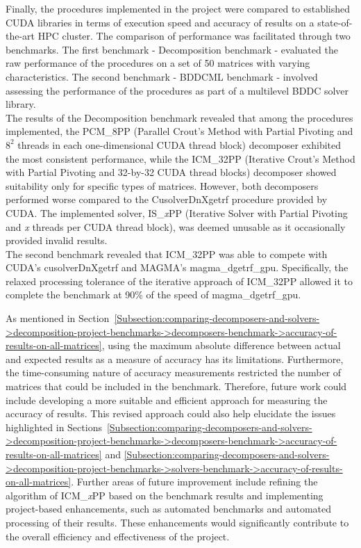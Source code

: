 Finally, the procedures implemented in the project were compared to established CUDA libraries in terms of execution speed and accuracy of results on a state-of-the-art HPC cluster.
The comparison of performance was facilitated through two benchmarks.
The first benchmark - Decomposition benchmark - evaluated the raw performance of the procedures on a set of 50 matrices with varying characteristics.
The second benchmark - BDDCML benchmark - involved assessing the performance of the procedures as part of a multilevel BDDC solver library.\\
The results of the Decomposition benchmark revealed that among the procedures implemented, the PCM\_8PP (Parallel Crout's Method with Partial Pivoting and $8^2$ threads in each one-dimensional CUDA thread block) decomposer exhibited the most consistent performance, while the ICM\_32PP (Iterative Crout's Method with Partial Pivoting and 32-by-32 CUDA thread blocks) decomposer showed suitability only for specific types of matrices.
However, both decomposers performed worse compared to the CusolverDnXgetrf procedure provided by CUDA.
The implemented solver, IS\_\textit{x}PP (Iterative Solver with Partial Pivoting and \textit{x} threads per CUDA thread block), was deemed unusable as it occasionally provided invalid results.\\
The second benchmark revealed that ICM\_32PP was able to compete with CUDA's cusolverDnXgetrf and MAGMA's magma\_dgetrf\_gpu.
Specifically, the relaxed processing tolerance of the iterative approach of ICM\_32PP allowed it to complete the benchmark at 90\% of the speed of magma\_dgetrf\_gpu.

As mentioned in Section~\ref{Subsection:comparing-decomposers-and-solvers->decomposition-project-benchmarks->decomposers-benchmark->accuracy-of-results-on-all-matrices}, using the maximum absolute difference between actual and expected results as a measure of accuracy has its limitations.
Furthermore, the time-consuming nature of accuracy measurements restricted the number of matrices that could be included in the benchmark.
Therefore, future work could include developing a more suitable and efficient approach for measuring the accuracy of results.
This revised approach could also help elucidate the issues highlighted in Sections~\ref{Subsection:comparing-decomposers-and-solvers->decomposition-project-benchmarks->decomposers-benchmark->accuracy-of-results-on-all-matrices} and \ref{Subsection:comparing-decomposers-and-solvers->decomposition-project-benchmarks->solvers-benchmark->accuracy-of-results-on-all-matrices}.
Further areas of future improvement include refining the algorithm of ICM\_\textit{x}PP based on the benchmark results and implementing project-based enhancements, such as automated benchmarks and automated processing of their results.
These enhancements would significantly contribute to the overall efficiency and effectiveness of the project.
